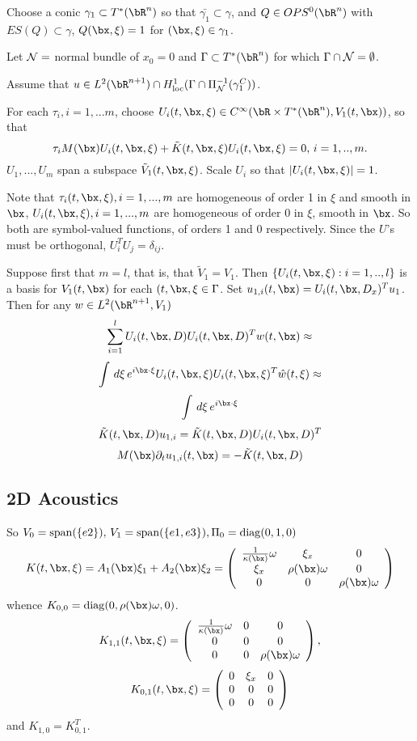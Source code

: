 Choose a conic $\gamma_1 \subset T^*(\bR^n)$ so that $\bar{\gamma_1} \subset \gamma$, and $Q \in OPS^0(\bR^n)$ with $ES(Q) \subset \gamma$, $Q(\bx,\xi) =1$ for $(\bx,\xi)\in \gamma_1$.

Let ${\cal N} = $ normal bundle of $x_0=0$ and $\Gamma \subset T^*(\bR^n)$ for which $\Gamma \cap {\cal N} = \emptyset$.

Assume that $u \in L^2(\bR^{n+1}) \cap H^1_{\rm loc}(\Gamma \cap \Pi_{\cal N}^{-1}(\gamma_1^C))$.



For each $\tau_i, i =1,...m$, choose $U_i(t,\bx,\xi) \in C^{\infty}(\bR \times T^*(\bR^n),V_1(t,\bx))$,  so that
\[
  \tau_i M(\bx) U_i(t,\bx,\xi) + \tilde{K}(t,\bx,\xi) U_i(t,\bx,\xi)=0, \, i=1,..,m.
\]
$U_1,...,U_m$ span a subspace $\tilde{V}_1(t,\bx,\xi)$. Scale $U_i$ so that $|U_i(t,\bx,\xi)| = 1$.

Note that $\tau_i(t,\bx,\xi), i=1,...,m$ are homogeneous of order 1 in $\xi$ and smooth in $\bx$, $U_i(t,\bx,\xi), i=1,...,m$ are homogeneous of order 0 in $\xi$, smooth in $\bx$. So both are symbol-valued functions, of orders 1 and 0 respectively. Since the $U$'s must be orthogonal, $U_i^TU_j = \delta_{ij}$.

Suppose first that $m=l$, that is, that $\tilde{V}_1=V_1$. Then $\{U_i(t,\bx,\xi):i=1,..,l\}$ is a basis for $V_1(t,\bx)$ for each $(t,\bx,\xi \in \Gamma$. Set $u_{1,i}(t,\bx) = U_i(t,\bx,D_x)^Tu_1$. Then for any $w \in L^2(\bR^{n+1},V_1)$
\[
  \sum_{i=1}^l U_i(t,\bx,D)U_i(t,\bx,D)^Tw(t,\bx) \approx
\]
\[
  \int \, d\xi \, e^{i \bx \cdot \xi} U_i(t,\bx,\xi)U_i(t,\bx,\xi)^T\hat{w}(t,\xi) \approx
\]
\[
  \int \, d\xi \, e^{i \bx \cdot \xi}
\]
\[
  \tilde{K}(t,\bx,D)u_{1,i} = \tilde{K}(t,\bx,D)U_i(t,\bx,D)^T
\]
\[
  M(\bx)\partial_t u_{1,i}(t,\bx) = -\tilde{K}(t,\bx,D)
\]

\subsection{2D Acoustics}
So $V_0={\rm span}(\{e2\}),\, V_1={\rm span}(\{e1,e3\}), \Pi_0 = {\rm diag}(0,1,0)$ 
\[
  K(t,\bx,\xi) =  A_1(\bx) \xi_1 + A_2(\bx) \xi_2 =
  \left(
    \begin{array}{ccc}
      \frac{1}{\kappa(\bx)}\omega & \xi_x & 0 \\
      \xi_x & \rho(\bx) \omega & 0 \\
      0 & 0 & \rho(\bx) \omega
    \end{array}
  \right)
\]
whence $K_{0,0} = {\rm diag}(0, \rho(\bx) \omega, 0)$.
\[
  K_{1,1}(t,\bx,\xi) =
  \left(
    \begin{array}{ccc}
      \frac{1}{\kappa(\bx)}\omega & 0 & 0 \\
      0 & 0 & 0 \\
      0 & 0 & \rho(\bx) \omega
    \end{array}
  \right),
\]
\[
  K_{0,1}(t,\bx,\xi) =
  \left(
    \begin{array}{ccc}
      0 & \xi_x & 0 \\
      0 & 0 & 0 \\
      0 & 0 & 0
    \end{array}
  \right)
\]
and $K_{1,0} = K_{0,1}^T$.
  
